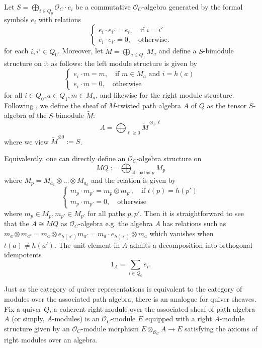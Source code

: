 \documentclass[11pt]{amsart}
\theoremstyle{plain}
\theoremstyle{definition}
\theoremstyle{remark}
\def\O{\mathcal{O}}
\begin{document}
Let $S= \bigoplus_{i\in Q_0} \O_C\cdot e_i$ be a commutative $\O_C$-algebra generated by the formal symbols $e_i$ with relations 
\[\begin{cases}
    e_i\cdot e_{i'} = e_{i}, \quad \textrm{if }i=i' \\
    e_i\cdot e_{i'} = 0 , \quad \textrm{otherwise}. 
\end{cases}\]
for each $i,i'\in Q_0$.
Moreover, let $\widetilde{M}= \bigoplus _{ a\in Q_1} M_a$ and define a $S$-bimodule structure on it as follows: the left module structure is given by
\[\begin{cases}
    e_i\cdot m = m, \quad \textrm{if }m\in M_a\textrm{ and }i=h(a)\\
    e_i\cdot m=0, \quad \textrm{otherwise}
\end{cases}  \]
for all $i\in Q_0, a\in Q_1, m\in M_a$, and likewise for the right module structure. Following \cite{CGP}, we define the sheaf of $M$-twisted path algebra $A$ of $Q$ as the tensor $S$-algebra of the $S$-bimodule $\widetilde{M}$:
\[ A = \bigoplus _{\ell\geq 0} \widetilde{M} ^{\otimes_S \ell}\]
where we view $\widetilde{M}^{\otimes 0} := S$. 

Equivalently, one can directly define an $\O_C$-algebra structure on 
\[ MQ:= \bigoplus_{\textrm{all paths }p}M_{p} \]
where $M_p = M_{a_1}\otimes ... \otimes M_{a_k}$ and the relation is given by 
\[\begin{cases}
   m_p\cdot m_{p'} = m_{p}\otimes m_{p'}, \quad \textrm{if }t(p) = h(p') \\
    m_p\cdot m_{p'} = 0, \quad \textrm{otherwise }
\end{cases}\]
where $m_p\in M_p,m_{p'}\in M_{p'}$ for all paths $p,p'$. Then it is straightforward to see that the $A\cong MQ$ as $\O_C$-algebra e.g. the algebra $A$ has relations such as $m_a \otimes m_{a'} = m_a \otimes e_{h(a')} m_{a'} = m_a \cdot e_{h(a')} \otimes m_a$ which vanishes when $t(a)\neq h(a')$. The unit element in $A$ admits a decomposition into orthogonal idempotents
\begin{equation}\label{eq:decomposition}
    1_A = \sum_{i\in Q_0}e_i. 
\end{equation} 

Just as the category of quiver representations is equivalent to the category of modules over the associated path algebra, there is an analogue for quiver sheaves. Fix a quiver $Q$, a coherent right module over the associated sheaf of path algebra $A$ (or simply, $A$-modules) is an $\O_C$-module $E$ equipped with a right $A$-module structure given by an $\O_C$-module morphism $E\otimes_{\O_C} A\to E$ satisfying the axioms of right modules over an algebra.  
\end{document}

